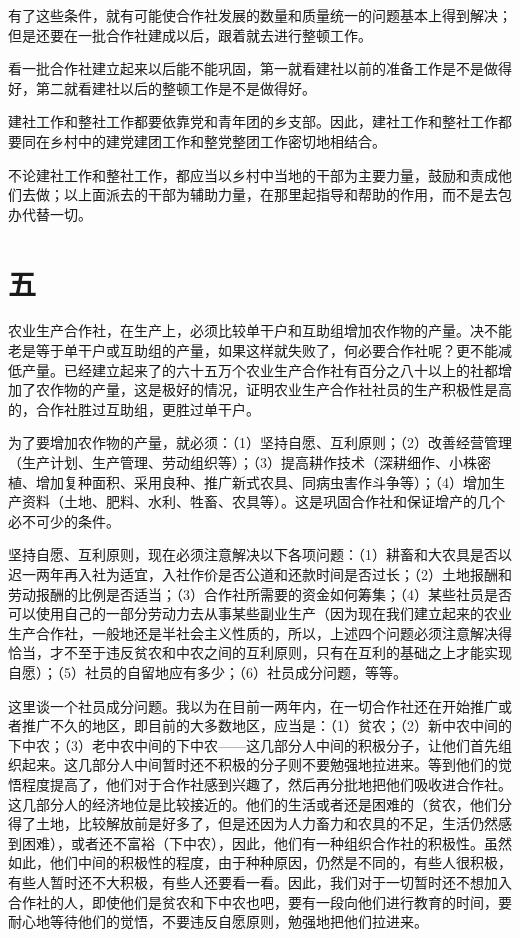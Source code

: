 有了这些条件，就有可能使合作社发展的数量和质量统一的问题基本上得到解决；但是还要在一批合作社建成以后，跟着就去进行整顿工作。

看一批合作社建立起来以后能不能巩固，第一就看建社以前的准备工作是不是做得好，第二就看建社以后的整顿工作是不是做得好。

建社工作和整社工作都要依靠党和青年团的乡支部。因此，建社工作和整社工作都要同在乡村中的建党建团工作和整党整团工作密切地相结合。

不论建社工作和整社工作，都应当以乡村中当地的干部为主要力量，鼓励和责成他们去做；以上面派去的干部为辅助力量，在那里起指导和帮助的作用，而不是去包办代替一切。

\section*{五}

农业生产合作社，在生产上，必须比较单干户和互助组增加农作物的产量。决不能老是等于单干户或互助组的产量，如果这样就失败了，何必要合作社呢？更不能减低产量。已经建立起来了的六十五万个农业生产合作社有百分之八十以上的社都增加了农作物的产量，这是极好的情况，证明农业生产合作社社员的生产积极性是高的，合作社胜过互助组，更胜过单干户。

为了要增加农作物的产量，就必须：（1）坚持自愿、互利原则；（2）改善经营管理（生产计划、生产管理、劳动组织等）；（3）提高耕作技术（深耕细作、小株密植、增加复种面积、采用良种、推广新式农具、同病虫害作斗争等）；（4）增加生产资料（土地、肥料、水利、牲畜、农具等）。这是巩固合作社和保证增产的几个必不可少的条件。

坚持自愿、互利原则，现在必须注意解决以下各项问题：（1）耕畜和大农具是否以迟一两年再入社为适宜，入社作价是否公道和还款时间是否过长；（2）土地报酬和劳动报酬的比例是否适当；（3）合作社所需要的资金如何筹集；（4）某些社员是否可以使用自己的一部分劳动力去从事某些副业生产（因为现在我们建立起来的农业生产合作社，一般地还是半社会主义性质的，所以，上述四个问题必须注意解决得恰当，才不至于违反贫农和中农之间的互利原则，只有在互利的基础之上才能实现自愿）；（5）社员的自留地应有多少；（6）社员成分问题，等等。

这里谈一个社员成分问题。我以为在目前一两年内，在一切合作社还在开始推广或者推广不久的地区，即目前的大多数地区，应当是：（1）贫农；（2）新中农中间的下中农；（3）老中农中间的下中农——这几部分人中间的积极分子，让他们首先组织起来。这几部分人中间暂时还不积极的分子则不要勉强地拉进来。等到他们的觉悟程度提高了，他们对于合作社感到兴趣了，然后再分批地把他们吸收进合作社。这几部分人的经济地位是比较接近的。他们的生活或者还是困难的（贫农，他们分得了土地，比较解放前是好多了，但是还因为人力畜力和农具的不足，生活仍然感到困难），或者还不富裕（下中农），因此，他们有一种组织合作社的积极性。虽然如此，他们中间的积极性的程度，由于种种原因，仍然是不同的，有些人很积极，有些人暂时还不大积极，有些人还要看一看。因此，我们对于一切暂时还不想加入合作社的人，即使他们是贫农和下中农也吧，要有一段向他们进行教育的时间，要耐心地等待他们的觉悟，不要违反自愿原则，勉强地把他们拉进来。

